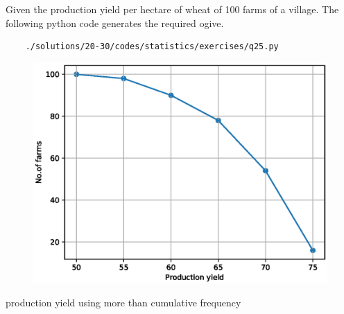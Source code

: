
	 Given the production yield per hectare of wheat of 100 farms of a village. 
		The following python code generates the required ogive.
	\begin{lstlisting}
	./solutions/20-30/codes/statistics/exercises/q25.py
	\end{lstlisting}


	
	\begin{figure}[!ht]
	\centering
	\includegraphics[width=\columnwidth]{./solutions/20-30/figs/statistics/exercises/ex_q25.eps}
	\caption{}
	\label{fig:q25_ogive}	
	\end{figure}
	
	\begin{table}[ht]
    	
	\caption{production yield using more than cumulative frequency}
	\label{table:stat_ex_q25anstable4}
	\end{table}



